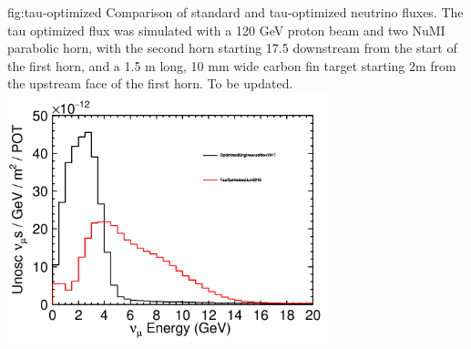 \begin{dunefigure}{fig:tau-optimized}
{Comparison of standard and tau-optimized neutrino fluxes.  The tau optimized flux was simulated with a 120 GeV proton beam and two NuMI parabolic horn, with the second horn starting 17.5 downstream from the start of the first horn, and a 1.5 m long, 10 mm wide carbon fin target starting 2m from the upstream face of the first horn.  To be updated.  }
\includegraphics[width=0.7\textwidth]{graphics/tau_optimized.png}
\end{dunefigure}

